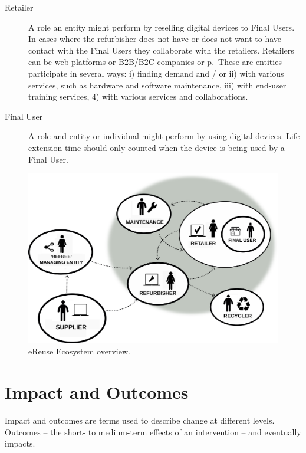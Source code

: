 \documentclass[
]{book}
\begin{document}
\begin{description}
\item[Retailer]
A role an entity might perform by reselling digital devices to Final Users. In cases where the refurbisher does not have or does not want to have contact with the Final Users they collaborate with the retailers. Retailers can be web platforms or B2B/B2C companies or p.~These are entities participate in several ways: i) finding demand and / or ii) with various services, such as hardware and software maintenance, iii) with end-user training services, 4) with various services and collaborations.
\item[Final User]
A role and entity or individual might perform by using digital devices. Life extension time should only counted when the device is being used by a Final User.
\end{description}



\begin{figure}

{\centering \includegraphics[width=1\linewidth]{./figs/3} 

}

\caption{eReuse Ecosystem overview.}\label{fig:ereuseecosystem}
\end{figure}

\hypertarget{impact-and-outcomes}{%
\section{Impact and Outcomes}\label{impact-and-outcomes}}

Impact and outcomes are terms used to describe change at different levels. Outcomes -- the short- to medium-term effects of an intervention -- and eventually impacts.
\end{document}
